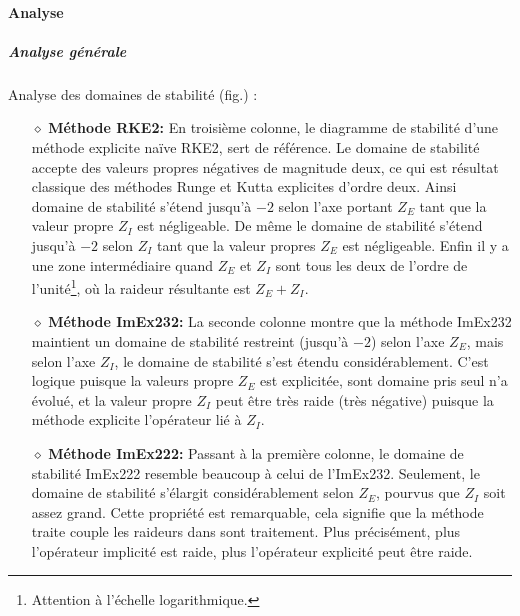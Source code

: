         \paragraph{Analyse}
            \subparagraph{Analyse générale}\label{par:analyse_generale_stab_nagumo}
                Analyse des domaines de stabilité (fig.) :
                \begin{itemize}
                    \item[$\diamond$]\textbf{Méthode RKE2:} En troisième colonne, le diagramme de stabilité d'une méthode explicite naïve RKE2, sert de référence. 
                        Le domaine de stabilité accepte des valeurs propres négatives de magnitude deux, ce qui est résultat classique des méthodes Runge et Kutta explicites d'ordre deux.
                        Ainsi domaine de stabilité s'étend jusqu'à $-2$ selon l'axe portant $Z_E$ tant que la valeur propre $Z_I$ est négligeable.
                        De même le domaine de stabilité s'étend jusqu'à $-2$ selon $Z_I$ tant que la valeur propres $Z_E$ est négligeable. 
                        Enfin il y a une zone intermédiaire quand $Z_E$ et $Z_I$ sont tous les deux de l'ordre de l'unité\footnote{Attention à l'échelle logarithmique.},
                        où la raideur résultante est $Z_E+Z_I$.

                    \item[$\diamond$]\textbf{Méthode ImEx232:} La seconde colonne montre que la méthode ImEx232 maintient un domaine de stabilité restreint (jusqu'à $-2$) selon l'axe $Z_E$,
                        mais selon l'axe $Z_I$, le domaine de stabilité s'est étendu considérablement. C'est logique puisque la valeurs propre $Z_E$ est explicitée,
                        sont domaine pris seul n'a évolué, et la valeur propre $Z_I$ peut être très raide (très négative) puisque la méthode explicite l'opérateur lié à $Z_I$.

                    \item[$\diamond$]\textbf{Méthode ImEx222:} Passant à la première colonne, le domaine de stabilité ImEx222 resemble beaucoup à celui de l'ImEx232. Seulement, le domaine de stabilité s'élargit considérablement
                        selon $Z_E$, pourvus que $Z_I$ soit assez grand. Cette propriété est remarquable, cela signifie que la méthode traite couple les raideurs dans sont traitement. 
                        Plus précisément, plus l'opérateur implicité est raide, plus l'opérateur explicité peut être raide.
                \end{itemize}
